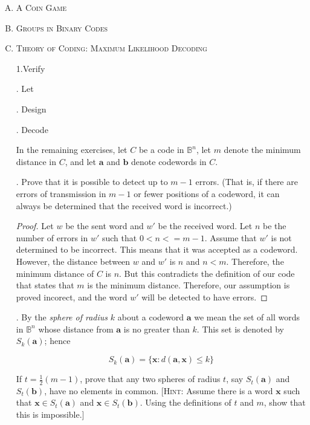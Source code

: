 \documentclass[twoside]{amsart}
\begin{document}
\begin{enumerate}[A.]
   

   \item \textsc{A Coin Game}

   \item \textsc{Groups in Binary Codes}

   \item \textsc{Theory of Coding: Maximum Likelihood Decoding}

      \noindent 1.Verify
      
      . Let
      
      . Design
      
      . Decode

      In the remaining exercises, let $C$ be a code in $\mathbb{B}^n$,
      let $m$ denote the minimum distance in $C$, and let 
      $\mathbf{a}$ and $\mathbf{b}$ denote codewords in $C$.

      . Prove that it is possible to detect up to $m-1$ errors.
      (That is, if there are errors of transmission in $m-1$ or 
      fewer positions of a codeword, it can always be determined
      that the received word is incorrect.)

      \begin{proof}
	 Let $w$ be the sent word and $w'$ be the received word. Let 
	 $n$ be the number of errors in $w'$ such that $0 < n <= m - 1$. 
	 Assume that $w'$ is not determined to be incorrect. This means
	 that it was accepted as a codeword. However, the distance
	 between $w$ and $w'$ is $n$ and $n < m$. Therefore, the 
	 minimum distance of $C$ is $n$. But this contradicts
	 the definition of our code that states that $m$ is the minimum
	 distance. Therefore, our assumption is proved incorect, and
	 the word $w'$ will be detected to have errors.
      \end{proof}

      . By the \emph{sphere of radius} $k$ about a codeword
      $\mathbf{a}$ we mean the set of all words in $\mathbb{B}^n$
      whose distance from $\mathbf{a}$ is no greater than $k$. This set
      is denoted by $S_k(\mathbf{a})$; hence 
      \begin{center}
      $$ S_k(\mathbf{a}) = \{\mathbf{x} : d(\mathbf{a},\mathbf{x}) \le k \}$$
      \end{center}

      If $t=\frac{1}{2}(m-1)$, prove that any two spheres of radius $t$,
      say $S_t(\mathbf{a})$ and $S_t(\mathbf{b})$, have no elements in
      common. [\textsc{Hint}: Assume there is a word $\mathbf{x}$ such
      that $\mathbf{x} \in S_t(\mathbf{a})$ and $\mathbf{x}\in S_t(
      \mathbf{b})$. Using the definitions of $t$ and $m$, show that
      this is impossible.]


\end{enumerate}
\end{document}
